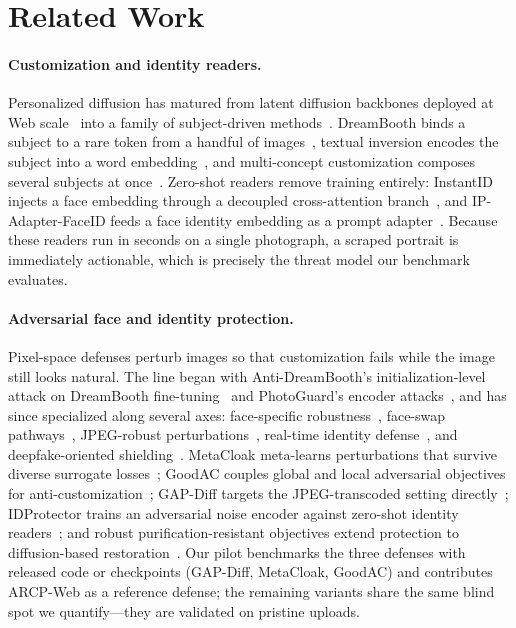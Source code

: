 \section{Related Work}
\label{sec:related}

\paragraph{Customization and identity readers.}
Personalized diffusion has matured from latent diffusion backbones deployed at
Web scale~\cite{rombach2021highresolution,shin2026latent} into a family of
subject-driven methods~\cite{cao2024controllable,wei2025personalized}.
DreamBooth binds a subject to a rare token from a handful of
images~\cite{ruiz2022dreambooth}, textual inversion encodes the subject into a
word embedding~\cite{gal2023inversion}, and multi-concept customization
composes several subjects at
once~\cite{kumari2023custom}. Zero-shot readers remove training entirely:
InstantID injects a face embedding through a decoupled cross-attention
branch~\cite{wang2024instantid}, and IP-Adapter-FaceID feeds a face identity
embedding as a prompt adapter~\cite{ye2023ipadapter}. Because these readers
run in seconds on a single photograph, a scraped portrait is immediately
actionable, which is precisely the threat model our benchmark evaluates.

\paragraph{Adversarial face and identity protection.}
Pixel-space defenses perturb images so that customization fails while the
image still looks natural. The line began with Anti-DreamBooth's
initialization-level attack on DreamBooth
fine-tuning~\cite{le2023antidreambooth} and PhotoGuard's encoder
attacks~\cite{salman2023raising}, and has since specialized along several
axes: face-specific robustness~\cite{wang2026hierarchical,qiu2026void},
face-swap pathways~\cite{wang2026safeguarding}, JPEG-robust
perturbations~\cite{fardin2026metacloakjpeg,kim2025blurguard}, real-time
identity defense~\cite{guo2024realtime}, and deepfake-oriented
shielding~\cite{jeong2025faceshield}. MetaCloak meta-learns perturbations that
survive diverse surrogate losses~\cite{liu2023metacloak}; GoodAC couples
global and local adversarial objectives for anti-customization~\cite{xu2025goodac};
GAP-Diff targets the JPEG-transcoded setting directly~\cite{zhu2025gapdiff};
IDProtector trains an adversarial noise encoder against zero-shot identity
readers~\cite{song2024idprotector}; and robust purification-resistant
objectives extend protection to diffusion-based
restoration~\cite{yang2025towards,wang2025antiaesthetics,salar2025enhancing,yahn2026personalized}.
Our pilot benchmarks the three defenses with released code or checkpoints
(GAP-Diff, MetaCloak, GoodAC) and contributes ARCP-Web as a reference defense;
the remaining variants share the same blind spot we quantify---they are
validated on pristine uploads.

